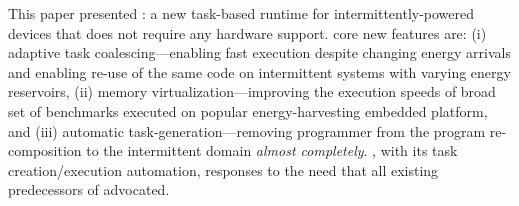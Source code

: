 This paper presented \sys: a new task-based runtime for intermittently-powered devices that does not require any hardware support. \sys core new features are: (i)  adaptive task coalescing---enabling fast execution despite changing energy arrivals and enabling re-use of the same code on intermittent systems with varying energy reservoirs, (ii) memory virtualization---improving the execution speeds of broad set of benchmarks executed on popular energy-harvesting embedded platform, and (iii) automatic task-generation---removing programmer from the program re-composition to the intermittent domain \emph{almost completely}. \sys, with its task creation/execution automation, responses to the need that all existing predecessors of \sys advocated.


